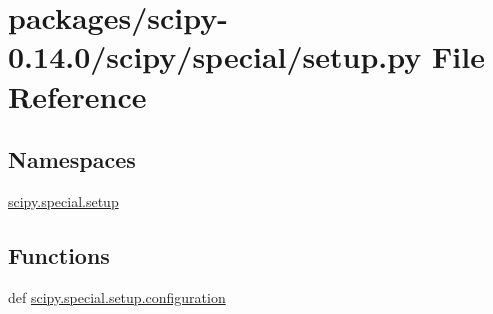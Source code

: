 \hypertarget{packages_2scipy-0_814_80_2scipy_2special_2setup_8py}{}\section{packages/scipy-\/0.14.0/scipy/special/setup.py File Reference}
\label{packages_2scipy-0_814_80_2scipy_2special_2setup_8py}
\subsection*{Namespaces}
\begin{DoxyCompactItemize}
\item 
 \hyperlink{namespacescipy_1_1special_1_1setup}{scipy.\+special.\+setup}
\end{DoxyCompactItemize}
\subsection*{Functions}
\begin{DoxyCompactItemize}
\item 
def \hyperlink{namespacescipy_1_1special_1_1setup_af49089a48399b605d5cd9a538512820c}{scipy.\+special.\+setup.\+configuration}
\end{DoxyCompactItemize}
